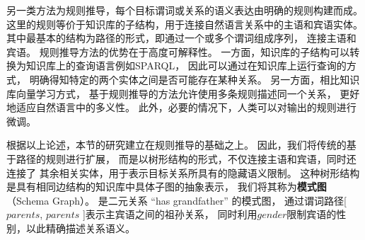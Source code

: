 
另一类方法为规则推导，每个目标谓词或关系的语义表达由明确的规则构建而成。
这里的规则等价于知识库的子结构，用于连接自然语言关系中的主语和宾语实体。
其中最基本的结构为路径的形式，即通过一个或多个谓词组成序列，
连接主语和宾语。
规则推导方法的优势在于高度可解释性。
一方面，知识库的子结构可以转换为知识库上的查询语言例如SPARQL，
因此可以通过在知识库上运行查询的方式，
明确得知特定的两个实体之间是否可能存在某种关系。
另一方面，相比知识库向量学习方式，
基于规则推导的方法允许使用多条规则描述同一个关系，
更好地适应自然语言中的多义性。
此外，必要的情况下，人类可以对输出的规则进行微调。




根据以上论述，本节的研究建立在规则推导的基础之上。
因此，我们将传统的基于路径的规则进行扩展，
而是以树形结构的形式，不仅连接主语和宾语，同时还连接了
其余相关实体，用于表示目标关系所具有的隐藏语义限制。
这种树形结构是具有相同边结构的知识库中具体子图的抽象表示，
我们将其称为\textbf{模式图}（Schema Graph）。
是二元关系 ``has grandfather'' 的模式图，
通过谓词路径[ $parents$, $parents$ ]表示主宾语之间的祖孙关系，
同时利用$gender$限制宾语的性别，以此精确描述关系语义。


